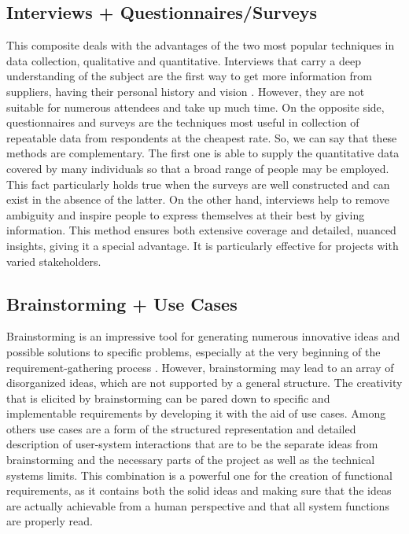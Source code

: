 \documentclass[conference]{IEEEtran}
\begin{document}
\subsection{Interviews + Questionnaires/Surveys}
This composite deals with the advantages of the two most popular techniques in data collection, qualitative and quantitative. Interviews that carry a deep understanding of the subject are the first way to get more information from suppliers, having their personal history and vision  \cite{cite16}. However, they are not suitable for numerous attendees and take up much time. On the opposite side, questionnaires and surveys are the techniques most useful in collection of repeatable data from respondents at the cheapest rate. So, we can say that these methods are complementary. The first one is able to supply the quantitative data covered by many individuals so that a broad range of people may be employed. This fact particularly holds true when the surveys are well constructed and can exist in the absence of the latter. On the other hand, interviews help to remove ambiguity and inspire people to express themselves at their best by giving information. This method ensures both extensive coverage and detailed, nuanced insights, giving it a special advantage. It is particularly effective for projects with varied stakeholders.

\subsection{Brainstorming + Use Cases}
Brainstorming is an impressive tool for generating numerous innovative ideas and possible solutions to specific problems, especially at the very beginning of the requirement-gathering process \cite{cite16}. However, brainstorming may lead to an array of disorganized ideas, which are not supported by a general structure. The creativity that is elicited by brainstorming can be pared down to specific and implementable requirements by developing it with the aid of use cases. Among others use cases are a form of the structured representation and detailed description of user-system interactions that are to be the separate ideas from brainstorming and the necessary parts of the project as well as the technical systems limits. This combination is a powerful one for the creation of functional requirements, as it contains both the solid ideas and making sure that the ideas are actually achievable from a human perspective and that all system functions are properly read.
\end{document}
